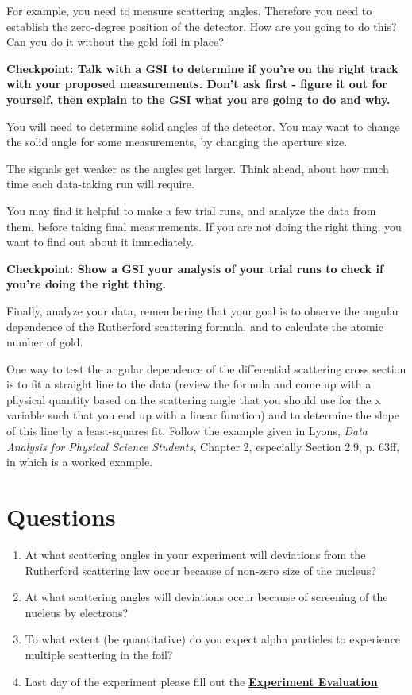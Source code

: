 \documentclass{../lab}
\begin{document}
For example, you need to measure scattering angles. Therefore you need to establish the zero-degree position of the detector. How are you going to do this? Can you do it without the gold foil in place?

\textbf{Checkpoint: Talk with a GSI to determine if you're on the right track with your proposed measurements. Don't ask first - figure it out for yourself, then explain to the GSI what you are going to do and why.}

You will need to determine solid angles of the detector. You may want to change the solid angle for some measurements, by changing the aperture size.

The signals get weaker as the angles get larger. Think ahead, about how much time each data-taking run will require.

You may find it helpful to make a few trial runs, and analyze the data from them, before taking final measurements. If you are not doing the right thing, you want to find out about it immediately.

\textbf{Checkpoint: Show a GSI your analysis of your trial runs to check if you're doing the right thing.}

Finally, analyze your data, remembering that your goal is to observe the angular dependence of the Rutherford scattering formula, and to calculate the atomic number of gold.

One way to test the angular dependence of the differential scattering cross section is to fit a straight line to the data (review the formula and come up with a physical quantity based on the scattering angle that you should use for the x variable such that you end up with a linear function) and to determine the slope of this line by a least-squares fit. Follow the example given in Lyons, \emph{Data Analysis for Physical Science Students, }Chapter 2, especially Section 2.9, p. 63ff, in which is a worked example.

\section{Questions}

\begin{enumerate}
    \item At what scattering angles in your experiment will deviations from the Rutherford scattering law occur because of non-zero size of the nucleus?

    \item At what scattering angles will deviations occur because of screening of the nucleus by electrons?

    \item To what extent (be quantitative) do you expect alpha particles to experience multiple scattering in the foil?

    \item Last day of the experiment please fill out the \href{\ExperimentEvaluation}{\textbf{Experiment Evaluation}}

\end{enumerate}
\end{document}
